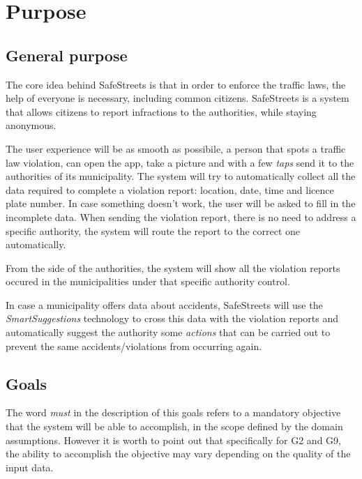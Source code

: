 \section{Purpose}
\subsection{General purpose}
The core idea behind SafeStreets is that in order to enforce the traffic laws,
the help of everyone is necessary, including common citizens.
SafeStreets is a system that allows citizens to report infractions to the
authorities, while staying anonymous.

The user experience will be as smooth as possibile, a person that spots a
traffic law violation, can open the app, take a picture and with a few
\emph{taps} send it to the authorities of its municipality.
The system will try to automatically collect all the data required to complete
a violation report: location, date, time and licence plate number. In case
something doesn't work, the user will be asked to fill in the incomplete data.
When sending the violation report, there is no need to address a specific
authority, the system will route the report to the correct one automatically.

From the side of the authorities, the system will show all the violation reports
occured in the municipalities under that specific authority control.

In case a municipality offers data about accidents, SafeStreets will use the
\emph{SmartSuggestions} technology to cross this data with the violation 
reports and automatically suggest the authority some \emph{actions} that can be
carried out to prevent the same accidents/violations from occurring again.

\subsection{Goals}

\begin{description}
\end{description}

\noindent
The word \emph{must} in the description of this goals refers to a mandatory
objective that the system will be able to accomplish, in the scope defined
by the domain assumptions.
However it is worth to point out that specifically for G2 and G9,
the ability to accomplish the objective may vary depending on the
quality of the input data.